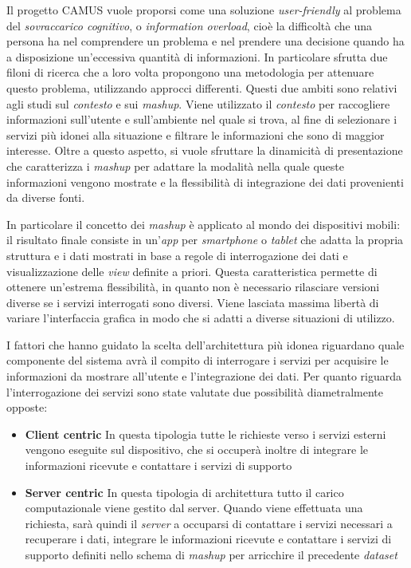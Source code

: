 Il progetto CAMUS vuole proporsi come una soluzione \emph{user-friendly} al problema del \emph{sovraccarico cognitivo}, o \emph{information overload}, cioè la difficoltà che una persona ha nel comprendere un problema e nel prendere una decisione quando ha a disposizione un'eccessiva quantità di informazioni. In particolare sfrutta due filoni di ricerca che a loro volta propongono una metodologia per attenuare questo problema, utilizzando approcci differenti. Questi due ambiti sono relativi agli studi sul \emph{contesto} e sui \emph{mashup}. Viene utilizzato il \emph{contesto} per raccogliere informazioni sull'utente e sull'ambiente nel quale si trova, al fine di selezionare i servizi più idonei alla situazione e filtrare le informazioni che sono di maggior interesse. Oltre a questo aspetto, si vuole sfruttare la dinamicità di presentazione che caratterizza i \emph{mashup} per adattare la modalità nella quale queste informazioni vengono mostrate e la flessibilità di integrazione dei dati provenienti da diverse fonti.

In particolare il concetto dei \emph{mashup} è applicato al mondo dei dispositivi mobili: il risultato finale consiste in un'\emph{app} per \emph{smartphone} o \emph{tablet} che adatta la propria struttura e i dati mostrati in base a regole di interrogazione dei dati e visualizzazione delle \emph{view} definite a priori. Questa caratteristica permette di ottenere un'estrema flessibilità, in quanto non è necessario rilasciare versioni diverse se i servizi interrogati sono diversi. Viene lasciata massima libertà di variare l'interfaccia grafica in modo che si adatti a diverse situazioni di utilizzo.

I fattori che hanno guidato la scelta dell'architettura più idonea riguardano quale componente del sistema avrà il compito di interrogare i servizi per acquisire le informazioni da mostrare all'utente e l'integrazione dei dati.
Per quanto riguarda l'interrogazione dei servizi sono state valutate due possibilità diametralmente opposte:

\begin{itemize}
	\item \textbf{Client centric}
	In questa tipologia tutte le richieste verso i servizi esterni vengono eseguite sul dispositivo, che si occuperà inoltre di integrare le informazioni ricevute e contattare i servizi di supporto
	\item \textbf{Server centric}
	In questa tipologia di architettura tutto il carico computazionale viene gestito dal server. Quando viene effettuata una richiesta, sarà quindi il \emph{server} a occuparsi di contattare i servizi necessari a recuperare i dati, integrare le informazioni ricevute e contattare i servizi di supporto definiti nello schema di \emph{mashup} per arricchire il precedente \emph{dataset}
\end{itemize}

